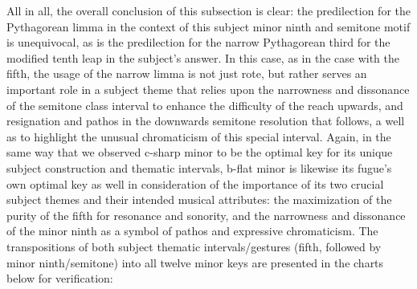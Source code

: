 All in all, the overall conclusion of this subsection is clear: the
predilection for the Pythagorean limma in the context of this subject
minor ninth and semitone motif is unequivocal, as is the predilection
for the narrow Pythagorean third for the modified tenth leap in the
subject's answer. In this case, as in the case with the fifth, the usage
of the narrow limma is not just rote, but rather serves an important
role in a subject theme that relies upon the narrowness and dissonance
of the semitone class interval to enhance the difficulty of the reach
upwards, and resignation and pathos in the downwards semitone resolution
that follows, a well as to highlight the unusual chromaticism of this
special interval. Again, in the same way that we observed c-sharp minor
to be the optimal key for its unique subject construction and thematic
intervals, b-flat minor is likewise its fugue's own optimal key as well
in consideration of the importance of its two crucial subject themes and
their intended musical attributes: the maximization of the purity of the
fifth for resonance and sonority, and the narrowness and dissonance of
the minor ninth as a symbol of pathos and expressive chromaticism. The
transpositions of both subject thematic intervals/gestures (fifth,
followed by minor ninth/semitone) into all twelve minor keys are
presented in the charts below for verification:


    \begin{center}
    \end{center}
    

    \begin{center}
    \end{center}
    
